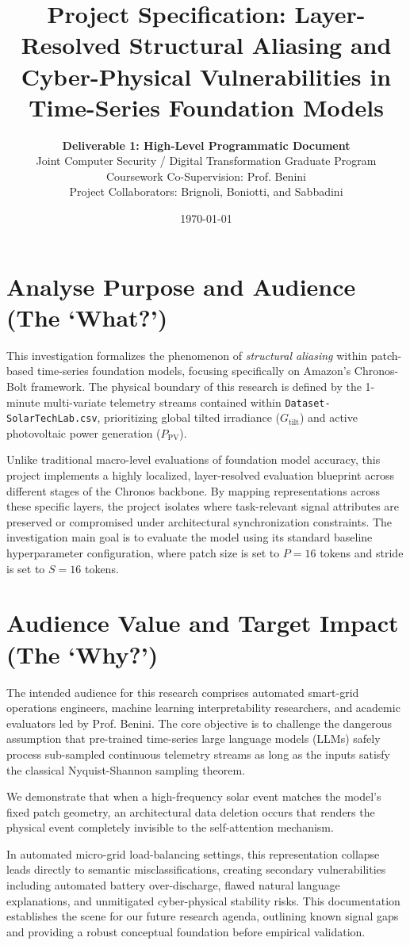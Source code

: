 \documentclass[11pt,a4paper]{article}
\title{\textbf{Project Specification: Layer-Resolved Structural Aliasing and Cyber-Physical Vulnerabilities in Time-Series Foundation Models}}
\author{\textbf{Deliverable 1: High-Level Programmatic Document} \\
Joint Computer Security / Digital Transformation Graduate Program \\
Coursework Co-Supervision: Prof. Benini \\
Project Collaborators: Brignoli, Boniotti, and Sabbadini}
\date{\today}
\begin{document}
\maketitle

\section{Analyse Purpose and Audience (The `What?')}
This investigation formalizes the phenomenon of \textit{structural aliasing} within patch-based time-series foundation models, focusing specifically on Amazon's Chronos-Bolt framework. The physical boundary of this research is defined by the 1-minute multi-variate telemetry streams contained within \texttt{Dataset-SolarTechLab.csv}, prioritizing global tilted irradiance ($G_{\mathrm{tilt}}$) and active photovoltaic power generation ($P_{\mathrm{PV}}$). 

Unlike traditional macro-level evaluations of foundation model accuracy, this project implements a highly localized, layer-resolved evaluation blueprint across different stages of the Chronos backbone. By mapping representations across these specific layers, the project isolates where task-relevant signal attributes are preserved or compromised under architectural synchronization constraints. The investigation main goal is to evaluate the model using its standard baseline hyperparameter configuration, where patch size is set to $P=16$ tokens and stride is set to $S=16$ tokens.

\section{Audience Value and Target Impact (The `Why?')}
The intended audience for this research comprises automated smart-grid operations engineers, machine learning interpretability researchers, and academic evaluators led by Prof. Benini. The core objective is to challenge the dangerous assumption that pre-trained time-series large language models (LLMs) safely process sub-sampled continuous telemetry streams as long as the inputs satisfy the classical Nyquist-Shannon sampling theorem. 

We demonstrate that when a high-frequency solar event matches the model's fixed patch geometry, an architectural data deletion occurs that renders the physical event completely invisible to the self-attention mechanism. 

In automated micro-grid load-balancing settings, this representation collapse leads directly to semantic misclassifications, creating secondary vulnerabilities including automated battery over-discharge, flawed natural language explanations, and unmitigated cyber-physical stability risks. This documentation establishes the scene for our future research agenda, outlining known signal gaps and providing a robust conceptual foundation before empirical validation.
\end{document}
